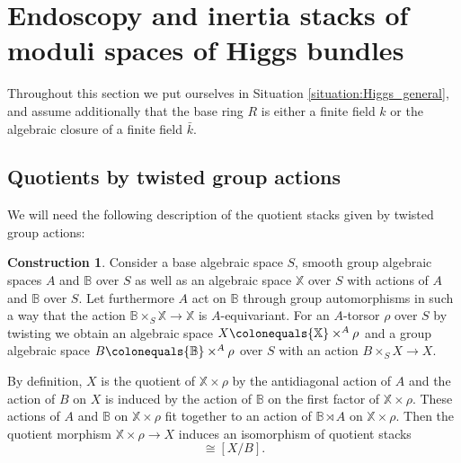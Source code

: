 \documentclass{article}
\newcommand{\BB}{{\mathbb{B}}}
\newcommand{\BX}{{\mathbb{X}}}
\newcommand{\defeq}{\colonequals}
\theoremstyle{definition}
\newtheorem{construction}[definition]{Construction}
\theoremstyle{plain}
\begin{document}
\section{Endoscopy and inertia stacks of moduli spaces of Higgs bundles}\label{secinst}
Throughout this section we put ourselves in Situation \ref{situation:Higgs_general}, and assume additionally that the base ring $R$ is either  a finite field $k$ or the algebraic closure of a finite field $\bar{k}$. 

\subsection{Quotients by twisted group actions}


We will need the following description of the quotient stacks given by twisted group actions:
\begin{construction} \label{TwistedQuotient}
  Consider a base algebraic space $S$, smooth group algebraic spaces $A$ and $\BB$ over $S$ as well as an algebraic space $\BX$ over $S$ with actions of $A$ and $\BB$ over $S$. Let furthermore $A$ act on $\BB$ through group automorphisms in such a way that the action $\BB \times_S \BX \to \BX$ is $A$-equivariant. For an $A$-torsor $\rho$ over $S$ by twisting we obtain an algebraic space $X\defeq \BX \times^A \rho$ and a group algebraic space $B \defeq \BB \times^A \rho$ over $S$ with an action $B \times_S X \to X$. 

By definition, $X$ is the quotient of $\BX \times \rho$ by the antidiagonal action of $A$ and the action of $B$ on $X$ is induced by the action of $\BB$ on the first factor of $\BX \times \rho$. These actions of $A$ and $\BB$ on $\BX \times \rho$ fit together to an action of $\BB \rtimes A$ on $\BX \times \rho$. Then the quotient morphism $\BX \times \rho \to X$ induces an isomorphism of quotient stacks
\begin{equation*}
  [(\BX \times \rho)/ (\BB \rtimes A)] \cong [X/B].
\end{equation*}
\end{construction}
\end{document}
